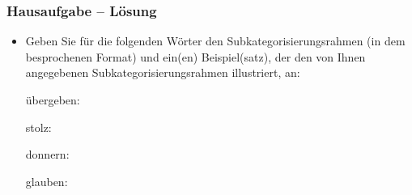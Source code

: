 \begin{frame}
\frametitle{Hausaufgabe -- Lösung} 

\begin{itemize}
	
	\item Geben Sie für die folgenden Wörter den Subkategorisierungsrahmen (in dem besprochenen Format) und ein(en) Beispiel(satz), der den von Ihnen angegebenen Subkategorisierungsrahmen illustriert, an:
	
	\settowidth \jamwidth{[Lesart 1]}
	
	\ea übergeben: \pause {} \jambox{\alertgreen{[Lesart 1]}}
	
	\pause 
	
	\ex stolz: \pause {}
	
	\pause 
	
	\ex donnern: \pause {}
	
	
	\ex glauben: \pause {}
	
	
	\z 
	
	
\end{itemize}

\end{frame}


